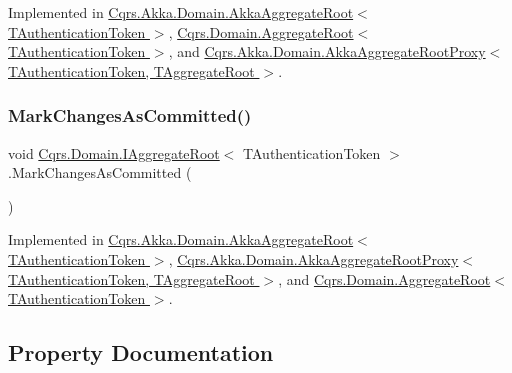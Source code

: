 Implemented in \hyperlink{classCqrs_1_1Akka_1_1Domain_1_1AkkaAggregateRoot_af6d84b07d4e9475bb88e769ac9081830}{Cqrs.\+Akka.\+Domain.\+Akka\+Aggregate\+Root$<$ T\+Authentication\+Token $>$}, \hyperlink{classCqrs_1_1Domain_1_1AggregateRoot_aec873ad6e4c98309cad2d9f1c534aebb}{Cqrs.\+Domain.\+Aggregate\+Root$<$ T\+Authentication\+Token $>$}, and \hyperlink{classCqrs_1_1Akka_1_1Domain_1_1AkkaAggregateRootProxy_ae611077a51a215aef7fd0e106734b386}{Cqrs.\+Akka.\+Domain.\+Akka\+Aggregate\+Root\+Proxy$<$ T\+Authentication\+Token, T\+Aggregate\+Root $>$}.

\mbox{\label{interfaceCqrs_1_1Domain_1_1IAggregateRoot_af31116870bbf6566b3eec0b8bc02c6de}} 
\subsubsection{\texorpdfstring{Mark\+Changes\+As\+Committed()}{MarkChangesAsCommitted()}}
{\footnotesize\ttfamily void \hyperlink{interfaceCqrs_1_1Domain_1_1IAggregateRoot}{Cqrs.\+Domain.\+I\+Aggregate\+Root}$<$ T\+Authentication\+Token $>$.Mark\+Changes\+As\+Committed (\begin{DoxyParamCaption}{ }\end{DoxyParamCaption})}



Implemented in \hyperlink{classCqrs_1_1Akka_1_1Domain_1_1AkkaAggregateRoot_a0d2615067175e5f8249bb2dc3d17ee0b}{Cqrs.\+Akka.\+Domain.\+Akka\+Aggregate\+Root$<$ T\+Authentication\+Token $>$}, \hyperlink{classCqrs_1_1Akka_1_1Domain_1_1AkkaAggregateRootProxy_aaa8a46fee21b6133ae4d1b2f60983d7e}{Cqrs.\+Akka.\+Domain.\+Akka\+Aggregate\+Root\+Proxy$<$ T\+Authentication\+Token, T\+Aggregate\+Root $>$}, and \hyperlink{classCqrs_1_1Domain_1_1AggregateRoot_adab968b830e186cb832583910bf6f3a6}{Cqrs.\+Domain.\+Aggregate\+Root$<$ T\+Authentication\+Token $>$}.



\subsection{Property Documentation}
\mbox{\label{interfaceCqrs_1_1Domain_1_1IAggregateRoot_a04aa3198f1371afa345a58e8fcb713d7}} 
